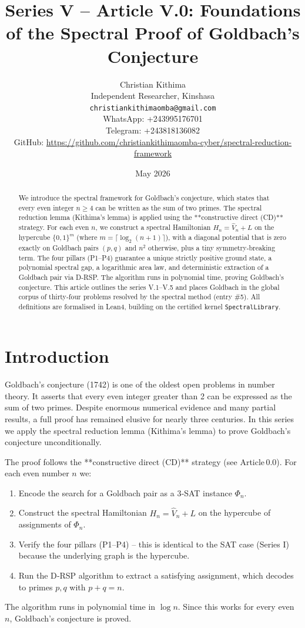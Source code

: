 \documentclass[11pt,a4paper]{article}
\title{Series V – Article V.0: Foundations of the Spectral Proof of Goldbach's Conjecture}
\author{Christian Kithima \\
Independent Researcher, Kinshasa \\
\texttt{christiankithimaomba@gmail.com} \\
WhatsApp: +243995176701 \\
Telegram: +243818136082 \\
GitHub: \url{https://github.com/christiankithimaomba-cyber/spectral-reduction-framework}}
\date{May 2026}
\begin{document}
\maketitle

\begin{abstract}
We introduce the spectral framework for Goldbach's conjecture, which states that every even integer \(n \ge 4\) can be written as the sum of two primes. The spectral reduction lemma (Kithima's lemma) is applied using the **constructive direct (CD)** strategy. For each even \(n\), we construct a spectral Hamiltonian \(H_n = \hat{V}_n + L\) on the hypercube \(\{0,1\}^m\) (where \(m = \lceil \log_2(n+1)\rceil\)), with a diagonal potential that is zero exactly on Goldbach pairs \((p,q)\) and \(n^2\) otherwise, plus a tiny symmetry‑breaking term. The four pillars (P1–P4) guarantee a unique strictly positive ground state, a polynomial spectral gap, a logarithmic area law, and deterministic extraction of a Goldbach pair via D‑RSP. The algorithm runs in polynomial time, proving Goldbach's conjecture. This article outlines the series V.1–V.5 and places Goldbach in the global corpus of thirty‑four problems resolved by the spectral method (entry \#5). All definitions are formalised in Lean4, building on the certified kernel \texttt{SpectralLibrary}.
\end{abstract}

\tableofcontents

\section{Introduction}

Goldbach's conjecture (1742) is one of the oldest open problems in number theory. It asserts that every even integer greater than 2 can be expressed as the sum of two primes. Despite enormous numerical evidence and many partial results, a full proof has remained elusive for nearly three centuries. In this series we apply the spectral reduction lemma (Kithima's lemma) to prove Goldbach's conjecture unconditionally.

The proof follows the **constructive direct (CD)** strategy (see Article 0.0). For each even number \(n\) we:
\begin{enumerate}
\item Encode the search for a Goldbach pair as a 3‑SAT instance \(\Phi_n\).
\item Construct the spectral Hamiltonian \(H_n = \hat{V}_n + L\) on the hypercube of assignments of \(\Phi_n\).
\item Verify the four pillars (P1–P4) – this is identical to the SAT case (Series I) because the underlying graph is the hypercube.
\item Run the D‑RSP algorithm to extract a satisfying assignment, which decodes to primes \(p,q\) with \(p+q=n\).
\end{enumerate}
The algorithm runs in polynomial time in \(\log n\). Since this works for every even \(n\), Goldbach's conjecture is proved.
\end{document}
